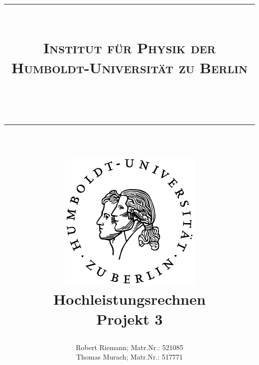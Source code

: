 \documentclass[a4paper,oneside,bibtotoc,pointlessnumbers,
halfparskip,DIV15]{scrartcl}
\newcommand{\lref}[1]{Listing (\ref{lst:#1})} %
\newcommand{\eref}[1]{Gl. (\ref{eqn:#1})} %
\begin{document}
\title{{\centering \rule{15cm}{0.001cm}\\
\Large{\textsc{Institut für Physik der
Humboldt-Universität zu Berlin}}}\\ \centering \rule{15cm}{0.001cm}\\
\vspace{15mm} \centering
\includegraphics[scale=0.9]{../../assets/siegel}\\
\vspace{18mm}
{\bf{\huge{Hochleistungsrechnen}}}\\
\vspace{12mm}
Projekt 3\\
\vspace{15mm}
}
\author{Robert Riemann; Matr.Nr.: 521085\\
Thomas Murach; Matr.Nr.: 517771\vspace{18mm}}
\maketitle

\newpage
% 
% 
% 
% 
% 
% 
% 
% 

%
%
% 
%
%
\end{document}
